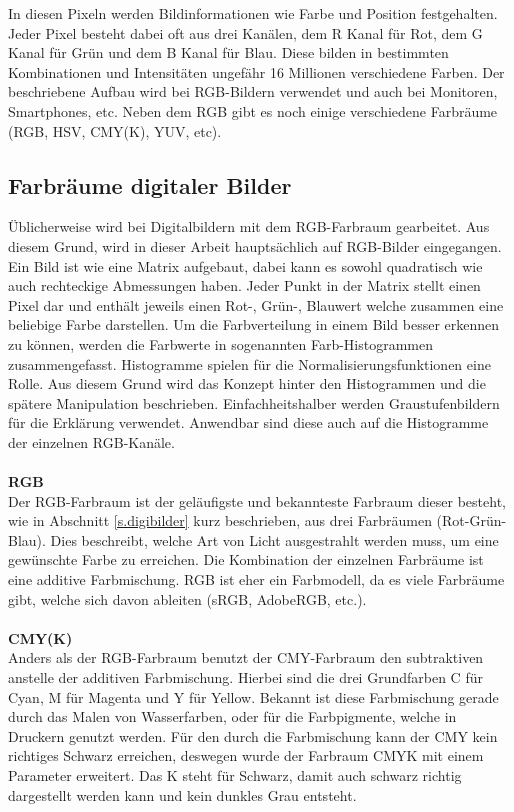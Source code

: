 In diesen Pixeln werden Bildinformationen wie Farbe und Position festgehalten. Jeder Pixel besteht dabei oft aus drei Kanälen, dem R Kanal für Rot, dem G Kanal für Grün und dem B Kanal für Blau. Diese bilden in bestimmten Kombinationen und Intensitäten ungefähr 16 Millionen verschiedene Farben. Der beschriebene Aufbau wird bei RGB-Bildern verwendet und auch bei Monitoren, Smartphones, etc. Neben dem RGB gibt es noch einige verschiedene Farbräume (RGB, HSV, CMY(K), YUV, etc).
\subsection{Farbräume digitaler Bilder}\label{s.aufbdigibilder}
Üblicherweise wird bei Digitalbildern mit dem RGB-Farbraum gearbeitet. Aus diesem Grund, wird in dieser Arbeit hauptsächlich auf RGB-Bilder eingegangen. Ein Bild ist wie eine Matrix aufgebaut, dabei kann es sowohl quadratisch wie auch rechteckige Abmessungen haben. Jeder Punkt in der Matrix stellt einen Pixel dar und enthält jeweils einen Rot-, Grün-, Blauwert welche zusammen eine beliebige Farbe darstellen. Um die Farbverteilung in einem Bild besser erkennen zu können, werden die Farbwerte in sogenannten Farb-Histogrammen zusammengefasst. Histogramme spielen für die Normalisierungsfunktionen eine Rolle. Aus diesem Grund wird das Konzept hinter den Histogrammen und die spätere Manipulation beschrieben. Einfachheitshalber werden Graustufenbildern für die Erklärung verwendet. Anwendbar sind diese auch auf die Histogramme der einzelnen RGB-Kanäle.\\\\
\textbf{RGB}\label{s.rgb}\\
Der RGB-Farbraum ist der geläufigste und bekannteste Farbraum dieser besteht, wie in Abschnitt \ref{s.digibilder} kurz beschrieben, aus drei Farbräumen (Rot-Grün-Blau). Dies beschreibt, welche Art von Licht ausgestrahlt werden muss, um eine gewünschte Farbe zu erreichen. Die Kombination der einzelnen Farbräume ist eine additive Farbmischung. RGB ist eher ein Farbmodell, da es viele Farbräume gibt, welche sich davon ableiten (sRGB, AdobeRGB, etc.).\\\\
\textbf{CMY(K)}\label{s.cmy}\\
Anders als der RGB-Farbraum benutzt der CMY-Farbraum den subtraktiven anstelle der additiven Farbmischung. Hierbei sind die drei Grundfarben C für Cyan, M für Magenta und Y für Yellow. Bekannt ist diese Farbmischung gerade durch das Malen von Wasserfarben, oder für die Farbpigmente, welche in Druckern genutzt werden. Für den durch die Farbmischung kann der CMY kein richtiges Schwarz erreichen, deswegen wurde der Farbraum CMYK mit einem Parameter erweitert. Das K steht für Schwarz, damit auch schwarz richtig dargestellt werden kann und kein dunkles Grau entsteht.\\\\
